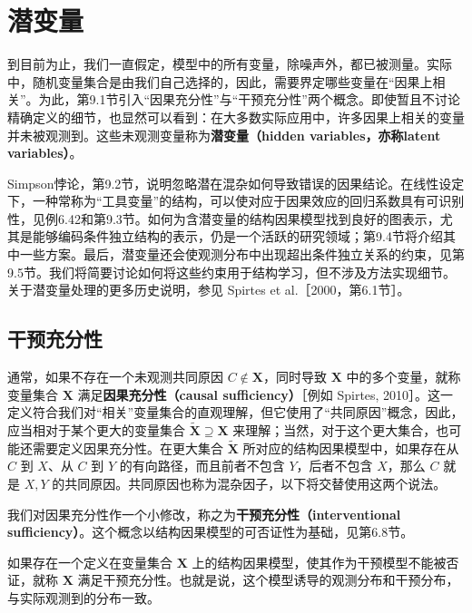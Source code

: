 \chapter{潜变量}
\label{ch:hidden-variables}
\providecommand{\chninenote}[1]{\stepcounter{chninetransnote}\begingroup
\renewcommand{\thefootnote}{译注\arabic{chninetransnote}}\footnote{#1}\addtocounter{footnote}{-1}\endgroup}

到目前为止，我们一直假定，模型中的所有变量，除噪声外，都已被测量。实际中，随机变量集合是由我们自己选择的，因此，需要界定哪些变量在“因果上相关”。为此，第9.1节引入“因果充分性”与“干预充分性”两个概念。即使暂且不讨论精确定义的细节，也显然可以看到：在大多数实际应用中，许多因果上相关的变量并未被观测到。这些未观测变量称为\textbf{潜变量（hidden variables，亦称latent variables）}。

Simpson悖论，第9.2节，说明忽略潜在混杂如何导致错误的因果结论。在线性设定下，一种常称为“工具变量”的结构，可以使对应于因果效应的回归系数具有可识别性，见例6.42和第9.3节。如何为含潜变量的结构因果模型找到良好的图表示，尤其是能够编码条件独立结构的表示，仍是一个活跃的研究领域；第9.4节将介绍其中一些方案。最后，潜变量还会使观测分布中出现超出条件独立关系的约束，见第9.5节。我们将简要讨论如何将这些约束用于结构学习，但不涉及方法实现细节。关于潜变量处理的更多历史说明，参见 Spirtes et al.［2000，第6.1节］。

\section{干预充分性}

通常，如果不存在一个未观测共同原因 $C\notin\mathbf X$，同时导致 $\mathbf X$ 中的多个变量，就称变量集合 $\mathbf X$ 满足\textbf{因果充分性（causal sufficiency）}［例如 Spirtes, 2010］。这一定义符合我们对“相关”变量集合的直观理解，但它使用了“共同原因”概念，因此，应当相对于某个更大的变量集合 $\widetilde{\mathbf X}\supseteq\mathbf X$ 来理解；当然，对于这个更大集合，也可能还需要定义因果充分性。在更大集合 $\widetilde{\mathbf X}$ 所对应的结构因果模型中，如果存在从 $C$ 到 $X$、从 $C$ 到 $Y$ 的有向路径，而且前者不包含 $Y$，后者不包含 $X$，那么 $C$ 就是 $X,Y$ 的共同原因。共同原因也称为混杂因子，以下将交替使用这两个说法。

我们对因果充分性作一个小修改，称之为\textbf{干预充分性（interventional sufficiency）}。这个概念以结构因果模型的可否证性为基础，见第6.8节。

\begin{definition}[干预充分性]
如果存在一个定义在变量集合 $\mathbf X$ 上的结构因果模型，使其作为干预模型不能被否证，就称 $\mathbf X$ 满足干预充分性。也就是说，这个模型诱导的观测分布和干预分布，与实际观测到的分布一致。
\end{definition}

